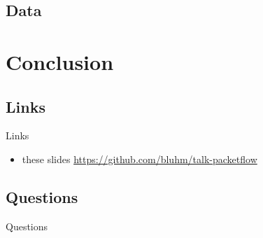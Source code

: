 \documentclass[14pt]{beamer}
\begin{document}
\subsection{Data}

\section{Conclusion}

\subsection{Links}
\begin{frame}{Links}
\begin{itemize}
    \item these slides
	{\small \url{https://github.com/bluhm/talk-packetflow}}
\end{itemize}
\end{frame}

\subsection{Questions}
\begin{frame}{Questions}
\begin{center}
\end{center}
\end{frame}
\end{document}
